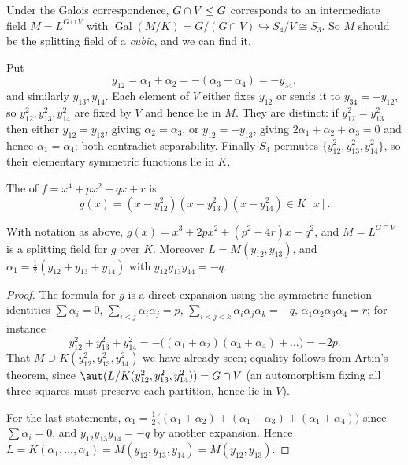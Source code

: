\documentclass[a4paper]{scrartcl}
\newcommand{\Gal}{\operatorname{Gal}}
\begin{document}
Under the Galois correspondence, $G \cap V \trianglelefteq G$ corresponds to an intermediate field $M = L^{G\cap V}$ with $\Gal(M/K) = G/(G\cap V) \hookrightarrow S_4/V \cong S_3$. So $M$ should be the splitting field of a \emph{cubic}, and we can find it.

Put
$$y_{12} = \alpha_1+\alpha_2 = -(\alpha_3+\alpha_4) = -y_{34},$$
and similarly $y_{13}, y_{14}$. Each element of $V$ either fixes $y_{12}$ or sends it to $y_{34} = -y_{12}$, so $y_{12}^2, y_{13}^2, y_{14}^2$ are fixed by $V$ and hence lie in $M$. They are distinct: if $y_{12}^2 = y_{13}^2$ then either $y_{12} = y_{13}$, giving $\alpha_2 = \alpha_3$, or $y_{12} = -y_{13}$, giving $2\alpha_1 + \alpha_2+\alpha_3 = 0$ and hence $\alpha_1 = \alpha_4$; both contradict separability. Finally $S_4$ permutes $\{y_{12}^2, y_{13}^2, y_{14}^2\}$, so their elementary symmetric functions lie in $K$.

\begin{definition}
	The  of $f = x^4+px^2+qx+r$ is
	$$g(x) = (x - y_{12}^2)(x-y_{13}^2)(x-y_{14}^2) \in K[x].$$
\end{definition}

\begin{proposition}
	With notation as above, $g(x) = x^3 + 2px^2 + (p^2-4r)x - q^2$, and $M = L^{G\cap V}$ is a splitting field for $g$ over $K$. Moreover $L = M(y_{12}, y_{13})$, and $\alpha_1 = \tfrac12(y_{12}+y_{13}+y_{14})$ with $y_{12}y_{13}y_{14} = -q$.
\end{proposition}

\begin{proof}
	The formula for $g$ is a direct expansion using the symmetric function identities $\sum\alpha_i = 0$, $\sum_{i<j}\alpha_i\alpha_j = p$, $\sum_{i<j<k}\alpha_i\alpha_j\alpha_k = -q$, $\alpha_1\alpha_2\alpha_3\alpha_4 = r$; for instance
	$$y_{12}^2+y_{13}^2+y_{14}^2 = -\big((\alpha_1+\alpha_2)(\alpha_3+\alpha_4)+\dots\big) = -2p.$$
	That $M \supseteq K(y_{12}^2,y_{13}^2,y_{14}^2)$ we have already seen; equality follows from Artin's theorem, since $\aut(L/K(y_{12}^2,y_{13}^2,y_{14}^2)) = G\cap V$ (an automorphism fixing all three squares must preserve each partition, hence lie in $V$).

	For the last statements, $\alpha_1 = \frac12\big((\alpha_1+\alpha_2)+(\alpha_1+\alpha_3)+(\alpha_1+\alpha_4)\big)$ since $\sum\alpha_i = 0$, and $y_{12}y_{13}y_{14} = -q$ by another expansion. Hence $L = K(\alpha_1,\dots,\alpha_4) = M(y_{12},y_{13},y_{14}) = M(y_{12},y_{13})$.
\end{proof}
\end{document}
